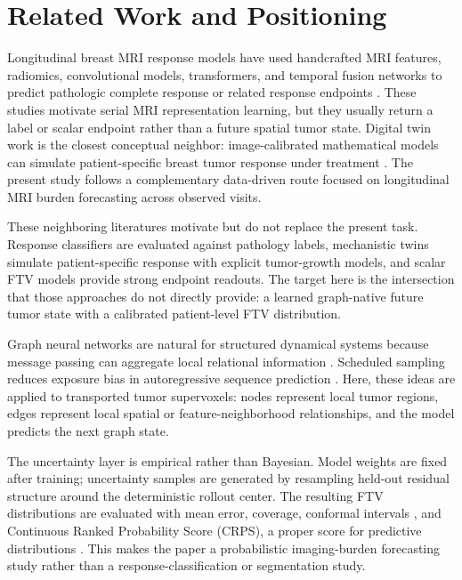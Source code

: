 \documentclass[journal,twoside,print]{ieeecolor}
\begin{document}
\section{Related Work and Positioning}
\label{sec:related}

Longitudinal breast MRI response models have used handcrafted MRI features,
radiomics, convolutional models, transformers, and temporal fusion networks to
predict pathologic complete response or related response endpoints
\cite{li2020ispy2mri,huang2023longitudinal,tang2025sti}. These studies
motivate serial MRI representation learning, but they usually return a label or
scalar endpoint rather than a future spatial tumor state. Digital twin work is
the closest conceptual neighbor: image-calibrated mathematical models can
simulate patient-specific breast tumor response under treatment
\cite{weis2013mechanically,wu2022digitalmodels,wu2025digitaltwins}. The present
study follows a complementary data-driven route focused on longitudinal MRI
burden forecasting across observed visits.

These neighboring literatures motivate but do not replace the present task.
Response classifiers are evaluated against pathology labels, mechanistic twins
simulate patient-specific response with explicit tumor-growth models, and
scalar FTV models provide strong endpoint readouts. The target here is the
intersection that those approaches do not directly provide: a learned
graph-native future tumor state with a calibrated patient-level FTV
distribution.

Graph neural networks are natural for structured dynamical systems because
message passing can aggregate local relational information
\cite{gilmer2017neural,sanchezgonzalez2018physics}. Scheduled sampling reduces
exposure bias in autoregressive sequence prediction \cite{bengio2015scheduled}.
Here, these ideas are applied to transported tumor supervoxels: nodes represent
local tumor regions, edges represent local spatial or feature-neighborhood
relationships, and the model predicts the next graph state.

The uncertainty layer is empirical rather than Bayesian. Model weights are
fixed after training; uncertainty samples are generated by resampling
held-out residual structure around the deterministic rollout center. The
resulting FTV distributions are evaluated with mean error, coverage, conformal
intervals \cite{angelopoulos2021conformal,romano2019cqr}, and Continuous
Ranked Probability Score (CRPS), a proper score for predictive distributions
\cite{gneiting2007proper}. This makes the paper a probabilistic imaging-burden
forecasting study rather than a response-classification or segmentation study.
\end{document}
